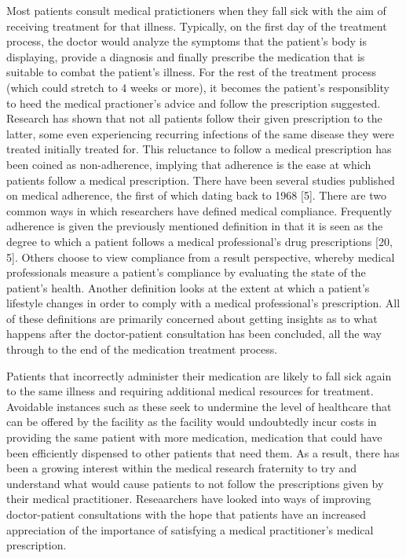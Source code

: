 Most patients consult medical pratictioners when they fall sick with the aim of receiving treatment for that illness. Typically, on the first day of the treatment process, the doctor would analyze the symptoms that the patient's body is displaying, provide a diagnosis and finally prescribe the medication that is suitable to combat the patient's illness. For the rest of the treatment process (which could stretch to 4 weeks or more), it becomes the patient's responsiblity to heed the medical practioner's advice and follow the prescription suggested. Research has shown that not all patients follow their given prescription to the latter, some even experiencing recurring infections of the same disease they were treated initially treated for. This reluctance to follow a medical prescription has been coined as non-adherence, implying that adherence is the ease at which patients follow a medical prescription. There have been several studies published on medical adherence, the first of which dating back to 1968 [5]. There are two common ways in which researchers have defined medical compliance. Frequently adherence is given the previously mentioned definition in that it is seen as the degree to which a patient follows a medical professional's drug prescriptions [20, 5]. Others choose to view compliance from a result perspective, whereby medical professionals measure a patient’s compliance by evaluating the state of the patient’s health. Another definition looks at the extent at which a patient’s lifestyle changes in order to comply with a medical professional’s prescription. All of these definitions are primarily concerned about getting insights as to what happens after the doctor-patient consultation has been concluded, all the way through to the end of the medication treatment process.

Patients that incorrectly administer their medication are likely to fall sick again to the same illness and requiring additional medical resources for treatment. Avoidable instances such as these seek to undermine the level of healthcare that can be offered by the facility as the facility would undoubtedly incur costs in providing the same patient with more medication, medication that could have been efficiently dispensed to other patients that need them. As a result, there has been a growing interest within the medical research fraternity to try and understand what would cause patients to not follow the prescriptions given by their medical practitioner. Reseaarchers have looked into ways of improving doctor-patient consultations with the hope that patients have an increased appreciation of the importance of satisfying a medical practitioner's medical prescription.

